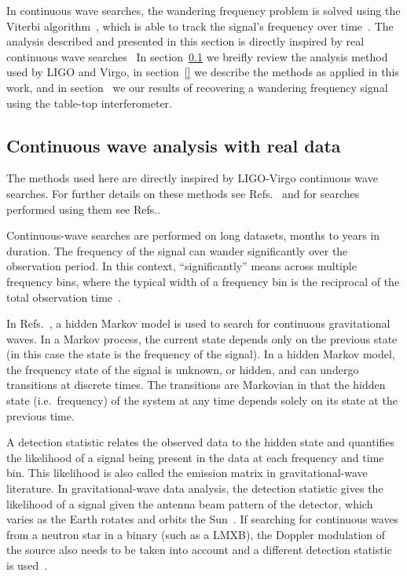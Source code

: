 \documentclass[paper-main.tex]{subfiles}
\begin{document}
In continuous wave searches, the wandering frequency problem is solved using the Viterbi algorithm~\cite{Viterbi:1967}, which is able to track the signal's frequency over time~\cite{SuvorovaEtAl:2016,SuvorovaEtAl:2017}. 
The analysis described and presented in this section is directly inspired by real continuous wave searches~\cite{} 
In section~\ref{sec:realCWSearches} we breifly review the analysis method used by LIGO and Virgo, in section~\ref{} we describe the methods as applied in this work, and in section~\cite{} we our results of recovering a wandering frequency signal using the table-top interferometer. 

\subsection{Continuous wave analysis with real data}
\label{sec:realCWSearches}

The methods used here are directly inspired by LIGO-Virgo continuous wave searches. 
For further details on these methods see Refs.~\cite{SuvorovaEtAl:2016,SuvorovaEtAl:2017} and for searches performed using them see Refs.\cite{ScoX1O2Viterbi:2019, ScoX1ViterbiO1:2017, MillhouseStrangMelatos:2020, JonesSun:2020, MiddletonEtAlO2LMXBs:2020, PostMergerRemnantSearch:2019, SunEtAlSNR:2018, viterbi_application}. 

Continuous-wave searches are performed on long datasets, months to years in duration. 
The frequency of the signal can wander significantly over the observation period. 
In this context, ``significantly'' means across multiple frequency bins, where the typical width of a frequency bin is the reciprocal of the total observation time~\cite{JKS:1998,ScoX1O2Viterbi:2019}.


In Refs.~\cite{SuvorovaEtAl:2016,SuvorovaEtAl:2017}, a hidden Markov model is used to search for continuous gravitational waves. 
In a Markov process, the current state depends only on the previous state (in this case the state is the frequency of the signal). 
In a hidden Markov model, the frequency state of the signal is unknown, or hidden, and can undergo transitions at discrete times. 
The transitions are Markovian in that the hidden state (i.e.\ frequency) of the system at any time depends solely on its state at the previous time. 


A detection statistic relates the observed data to the hidden state and quantifies the likelihood of a signal being present in the data at each frequency and time bin.
This likelihood is also called the emission matrix in gravitational-wave literature.  
In gravitational-wave data analysis, the detection statistic gives the likelihood of a signal given the antenna beam pattern of the detector, which varies as the Earth rotates and orbits the Sun~\cite{JKS:1998}.
If searching for continuous waves from a neutron star in a binary (such as a LMXB), the Doppler modulation of the source also needs to be taken into account and a different detection statistic is used~\cite{SuvorovaEtAl:2017}. 
\end{document}
